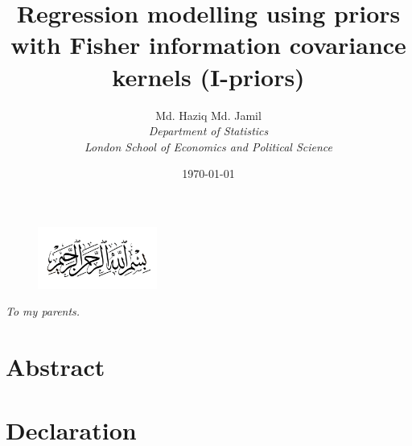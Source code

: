 \documentclass[a4paper,showframe,11pt]{report}
\begin{document}
\title{Regression modelling using priors with Fisher information covariance kernels (I-priors)}
\author{
  Md. Haziq Md. Jamil\\
  \normalsize{\it{Department of Statistics}}\\
  \normalsize{\it{London School of Economics and Political Science}}
}
\date{\normalsize\today}
\maketitle

\newpage  %
\setcounter{page}{2}
\begin{figure}[H]
  \centering
  \includegraphics[width=0.35\textwidth]{figure/bismillah}
\end{figure}
\begin{center}
  \textit{To my parents.}
\end{center}

\chapter*{Abstract} 
\chapter*{Declaration} 
\end{document}

